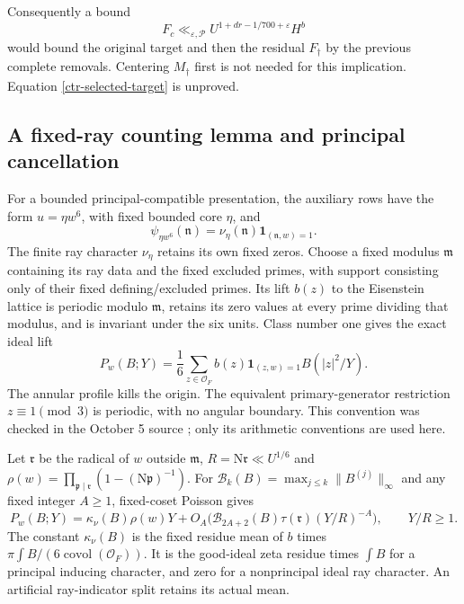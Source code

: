 \documentclass[11pt]{article}
\theoremstyle{definition}
\newcommand{\N}{\mathrm N}
\newcommand{\eps}{\varepsilon}
\newcommand{\Id}{\mathbf 1}
\newcommand{\lls}{\ll_{\eps,\mathcal P}}
\begin{document}
Consequently a bound
\begin{equation}\label{ctr-selected-target}
 F_c\lls U^{1+dr-1/700+\eps}H^b
\end{equation}
would bound the original target and then the residual $F_\dagger$ by
the previous complete removals. Centering $M_\dagger$ first is not
needed for this implication. Equation \eqref{ctr-selected-target}
is unproved.

\subsection{A fixed-ray counting lemma and principal cancellation}
For a bounded principal-compatible presentation, the auxiliary rows
have the form $u=\eta w^6$, with fixed bounded core $\eta$, and
\[
 \psi_{\eta w^6}(\mathfrak n)
       =\nu_\eta(\mathfrak n)\Id_{(\mathfrak n,w)=1}.
\]
The finite ray character $\nu_\eta$ retains its own fixed zeros.
Choose a fixed modulus $\mathfrak m$ containing its ray data and the
fixed excluded primes, with support consisting only of their fixed
defining/excluded primes. Its lift $b(z)$ to the Eisenstein lattice is
periodic modulo $\mathfrak m$, retains its zero values at every
prime dividing that modulus, and is invariant under the six units.
Class number one gives the exact ideal lift
\[
 P_w(B;Y)=\frac16\sum_{z\in\mathcal O_F}
             b(z)\Id_{(z,w)=1}B(|z|^2/Y).
\]
The annular profile kills the origin. The equivalent primary-generator
restriction $z\equiv1\pmod3$ is periodic, with no angular boundary.
This convention was checked in the October 5 source \cite{source-conventions};
only its arithmetic conventions are used here.

Let $\mathfrak r$ be the radical of $w$ outside $\mathfrak m$,
$R=\N\mathfrak r\ll U^{1/6}$ and
$\rho(w)=\prod_{\mathfrak p\mid\mathfrak r}(1-(\N\mathfrak p)^{-1})$.
For $\mathcal B_k(B)=\max_{j\le k}\|B^{(j)}\|_\infty$ and any
fixed integer $A\ge1$, fixed-coset Poisson gives
\begin{equation}\label{ctr-principal-count}
 P_w(B;Y)=\kappa_\nu(B)\rho(w)Y+
 O_A\bigl(\mathcal B_{2A+2}(B)\tau(\mathfrak r)(Y/R)^{-A}\bigr),
 \qquad Y/R\ge1 .
\end{equation}
The constant $\kappa_\nu(B)$ is the fixed residue mean of $b$
times $\pi\int B/(6\operatorname{covol}(\mathcal O_F))$.
It is the good-ideal zeta residue times $\int B$ for a principal
inducing character, and zero for a nonprincipal ideal ray character.
An artificial ray-indicator split retains its actual mean.
\end{document}
